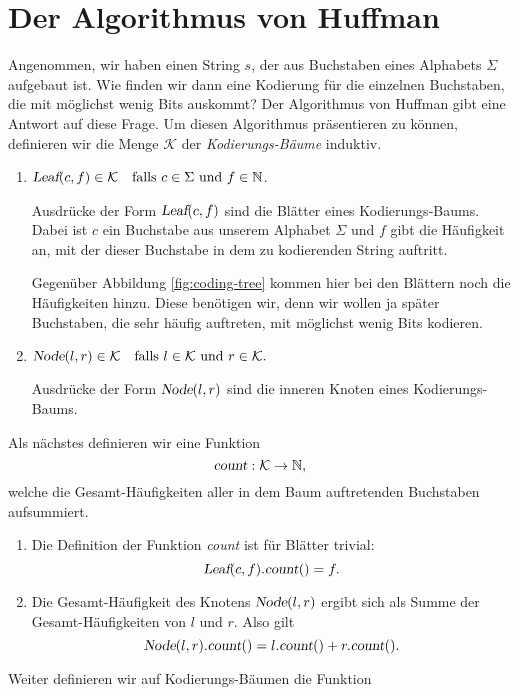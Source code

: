 \section[Huffman's Algorithm]{Der Algorithmus von Huffman}
Angenommen, wir haben einen String $s$, der aus Buchstaben eines Alphabets $\Sigma$
aufgebaut ist.  Wie finden wir dann eine Kodierung f\"ur die einzelnen Buchstaben, die
mit m\"oglichst wenig Bits auskommt?  Der Algorithmus von Huffman gibt eine Antwort auf diese
Frage. Um diesen Algorithmus pr\"asentieren zu k\"onnen, definieren wir die Menge
$\mathcal{K}$ der \emph{Kodierungs-B\"aume} induktiv.  
\begin{enumerate}
\item $\textsl{Leaf}(c,f) \in \mathcal{K} \quad \mbox{falls $c \in \Sigma$ und $f \in {\mathbb N}$}$.

      Ausdr\"ucke der Form $\textsl{Leaf}(c,f)$ sind die Bl\"atter eines Kodierungs-Baums.
      Dabei ist $c$ ein Buchstabe aus unserem Alphabet $\Sigma$ und $f$ gibt die
      H\"aufigkeit an, mit der dieser Buchstabe in dem zu kodierenden String auftritt.

      Gegen\"uber Abbildung \ref{fig:coding-tree} kommen hier bei den Bl\"attern noch die
      H\"aufigkeiten hinzu.  Diese ben\"otigen wir, denn wir wollen ja sp\"ater Buchstaben,
      die sehr h\"aufig auftreten, mit m\"oglichst wenig Bits kodieren.  

\item $\textsl{Node}(l,r) \in \mathcal{K} \quad 
       \mbox{falls $l \in\mathcal{K}$ und $r \in \mathcal{K}$.}$ 

      Ausdr\"ucke der Form $\textsl{Node}(l,r)$ sind die inneren Knoten eines
      Kodierungs-Baums.  
\end{enumerate}
Als n\"achstes  definieren wir eine Funktion 
\[  \textsl{count} : \mathcal{K} \rightarrow {\mathbb N}, \]
welche die  Gesamt-H\"aufigkeiten aller in dem Baum auftretenden Buchstaben aufsummiert.
\begin{enumerate}
\item Die Definition der Funktion \textsl{count} ist f\"ur Bl\"atter trivial:
      \[ \textsl{Leaf}(c,f).\textsl{count}() = f. \]
\item Die Gesamt-H\"aufigkeit des Knotens $\textsl{Node}(l,r)$
      ergibt sich als Summe der Gesamt-H\"aufigkeiten von $l$ und $r$. Also gilt
      \[ \textsl{Node}(l,r).\textsl{count}() = l.\textsl{count}() + r.\textsl{count}(). \]
\end{enumerate}
Weiter definieren wir auf Kodierungs-B\"aumen die Funktion
